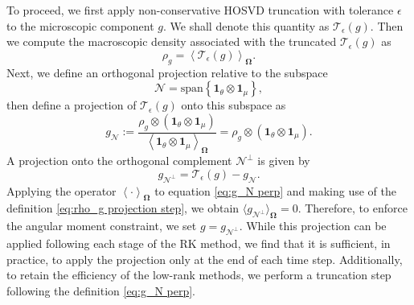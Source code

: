 \documentclass[onefignum,onetabnum]{siamart220329}
\begin{document}
To proceed, we first apply non-conservative HOSVD truncation with tolerance $\epsilon$ to the microscopic component $g$. We shall denote this quantity as $\mathcal{T}_{\epsilon}(g)$. Then we compute the macroscopic density associated with the truncated $\mathcal{T}_{\epsilon}(g)$ as
\begin{equation}
    \label{eq:rho_g projection step}
    \rho_{g} = \left\langle \mathcal{T}_{\epsilon}(g) \right\rangle_{\mathbf{\Omega}}.
\end{equation}
Next, we define an orthogonal projection relative to the subspace
\begin{equation*}
    \mathcal{N} = \text{span} \left\{ \mathbf{1}_{\theta} \otimes \mathbf{1}_{\mu} \right\},
\end{equation*}
then define a projection of $\mathcal{T}_{\epsilon}(g)$ onto this subspace as
\begin{equation}
    \label{eq:g_N}
    g_{\mathcal{N}} := \frac{\rho_{g} \otimes \left( \mathbf{1}_{\theta} \otimes \mathbf{1}_{\mu} \right)}{ \left\langle \mathbf{1}_{\theta} \otimes \mathbf{1}_{\mu} \right\rangle_{\mathbf{\Omega}} } = \rho_{g} \otimes \left( \mathbf{1}_{\theta} \otimes \mathbf{1}_{\mu} \right).
\end{equation}
A projection onto the orthogonal complement $\mathcal{N}^{\perp}$ is given by
\begin{equation}
    \label{eq:g_N perp}
    g_{\mathcal{N}^{\perp}} = \mathcal{T}_{\epsilon}(g) - g_{\mathcal{N}}.
\end{equation}
Applying the operator $\left\langle \cdot \right\rangle_{\mathbf{\Omega}}$ to equation \eqref{eq:g_N perp} and making use of the definition \eqref{eq:rho_g projection step}, we obtain $\langle g_{\mathcal{N}^{\perp}} \rangle_{\mathbf{\Omega}} = 0$. Therefore, to enforce the angular moment constraint, we set $g = g_{\mathcal{N}^{\perp}}$. While this projection can be applied following each stage of the RK method, we find that it is sufficient, in practice, to apply the projection only at the end of each time step. Additionally, to retain the efficiency of the low-rank methods, we perform a truncation step following the definition \eqref{eq:g_N perp}.







\end{document}
